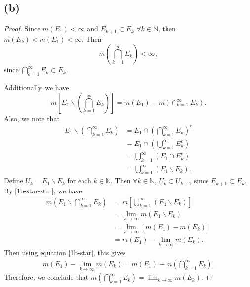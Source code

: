 \documentclass{article}
\newcommand{\N}{\mathbb{N}} %
\begin{document}
\subsection*{(b)}
\begin{proof}
	Since $m(E_1) < \infty$ and $E_{k+1} \subset E_k$ $\forall k \in \N$, then $m(E_k) < m(E_1) < \infty$. Then
	\begin{equation}
		m\left(\bigcap_{k=1}^{\infty} E_k \right) < \infty,
	\end{equation}
	since $\bigcap_{k=1}^{\infty} E_k \subset E_k$.
	
	Additionally, we have
	\begin{equation}\label{1b-star}
		m\left[E_1 \backslash \left(\bigcap_{k=1}^{\infty}E_k\right)\right] = m(E_1) - m\left(\cap_{k=1}^{\infty}E_k\right).
	\end{equation}
	Also, we note that
	\begin{align}
		E_1 \backslash \left(\bigcap_{k=1}^{\infty} E_k \right) &= E_1 \cap \left(\bigcap_{k=1}^{\infty}E_k\right)^c \\
		&= E_1 \cap \left(\bigcup_{k=1}^{\infty} E_k^c\right) \\
		&= \bigcup_{k=1}^{\infty} \left(E_1 \cap E_k^c\right) \\
		&= \bigcup_{k=1}^{\infty}\left(E_1 \backslash E_k \right). \label{1b-star-star}
	\end{align}
	Define $U_k = E_1 \backslash E_k$ for each $k \in \N$. Then $\forall k \in \N$, $U_k \subset U_{k+1}$ since $E_{k+1} \subset E_k$. By \eqref{1b-star-star}, we have
	\begin{align}
		m\left(E_1 \backslash \bigcap_{k=1}^{\infty}E_k\right) &= m\left[\bigcup_{k=1}^{\infty}(E_1 \backslash E_k)\right] \\
		&= \lim_{k \to \infty} m(E_1 \backslash E_k) \\
		&= \lim_{k \to \infty} \left[m(E_1) - m(E_k)\right] \\
		&= m(E_1) - \lim_{k \to \infty}m(E_k).
	\end{align}
	Then using equation \eqref{1b-star}, this gives
	\begin{align}
		m(E_1) - \lim_{k \to \infty} m(E_k) = m(E_1) - m\left(\bigcap_{k=1}^{\infty} E_k \right).
	\end{align}
	Therefore, we conclude that $m\left(\bigcap_{k=1}^{\infty}E_k\right) = \lim_{k \to \infty} m(E_k)$.
\end{proof}
\end{document}
